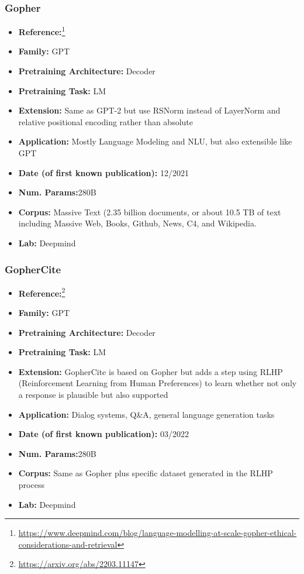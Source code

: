 \documentclass{article}
\begin{document}
\subsubsection{Gopher}

            \begin{itemize}
                \item \textbf{Reference:}\footnote{\url{https://www.deepmind.com/blog/language-modelling-at-scale-gopher-ethical-considerations-and-retrieval}}\cite{rae2021scaling}
                \item \textbf{Family:} GPT 
                \item \textbf{Pretraining Architecture:} Decoder
                \item \textbf{Pretraining Task:} LM
                \item \textbf{Extension:} Same as GPT-2 but use RSNorm instead of LayerNorm and relative positional encoding rather than absolute  
                \item \textbf{Application:} Mostly Language Modeling and NLU, but also extensible like GPT
                \item \textbf{Date (of first known publication):} 12/2021
                \item \textbf{Num. Params:}280B
                \item \textbf{Corpus:} Massive Text (2.35 billion documents, or about 10.5 TB of text including Massive Web, Books, Github, News, C4, and Wikipedia.
                \item \textbf{Lab:} Deepmind
            \end{itemize}

\subsubsection{GopherCite}

            \begin{itemize}
                \item \textbf{Reference:}\footnote{\url{https://arxiv.org/abs/2203.11147}}\cite{menick2022teaching}
                \item \textbf{Family:} GPT 
                \item \textbf{Pretraining Architecture:} Decoder
                \item \textbf{Pretraining Task:} LM
                \item \textbf{Extension:} GopherCite is based on Gopher but adds a step using RLHP (Reinforcement Learning from Human Preferences) to learn whether not only a response is plausible but also supported  
                \item \textbf{Application:} Dialog systems, Q\&A, general language generation tasks
                \item \textbf{Date (of first known publication):} 03/2022
                \item \textbf{Num. Params:}280B
                \item \textbf{Corpus:} Same as Gopher plus specific dataset generated in the RLHP process
                \item \textbf{Lab:} Deepmind
            \end{itemize}
\end{document}
